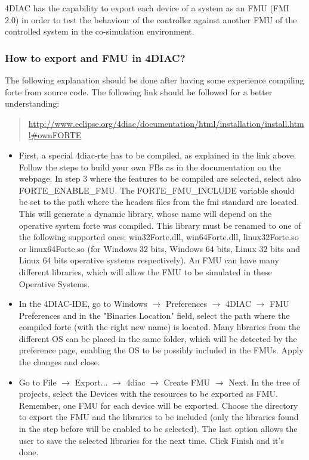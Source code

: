 4DIAC has the capability to export each device of a system as an FMU (FMI 2.0) in order to test the behaviour of the controller against another FMU of the controlled system in 
the co-simulation environment. 

\subsubsection{How to export and FMU in 4DIAC?}\label{sec:simulators:4diac:exportFMU}

The following explanation should be done after having some experience compiling forte from source code. The following link should be followed for a better understanding:

\begin{quote}
  \url{http://www.eclipse.org/4diac/documentation/html/installation/install.html#ownFORTE}
\end{quote}

\begin{itemize}
    \item First, a special 4diac-rte has to be compiled, as explained in the link above. Follow the steps to build your own FBs as in the documentation 
    on the webpage. In step 3 where the features to be compiled are selected, select also FORTE\_ENABLE\_FMU. The FORTE\_FMU\_INCLUDE variable should be set to the path where the headers files 
    from the fmi standard are located. This will generate a dynamic library, whose name will depend on the operative system forte was compiled. This library must be renamed to one of the following 
    supported ones: win32Forte.dll, win64Forte.dll, linux32Forte.so or linux64Forte.so (for Windows 32 bits, Windows 64 bits, Linux 32 bits and Linux 64 bits operative systems respectively). 
    An FMU can have many different libraries, which will allow the FMU to be simulated in these Operative Systems.
    \item In the 4DIAC-IDE, go to Windows $\rightarrow$ Preferences $\rightarrow$ 4DIAC $\rightarrow$ FMU Preferences and in the "Binaries Location" field, select the path where the compiled forte (with the right new name) 
    is located. Many libraries from the different OS can be placed in the same folder, which will be detected by the preference page, enabling the OS to be possibly included in the FMUs.
     Apply the changes and close.
    \item Go to File $\rightarrow$ Export... $\rightarrow$ 4diac $\rightarrow$ Create FMU $\rightarrow$ Next. In the tree of projects, select the Devices with the resources to be exported as FMU. Remember, one FMU for each device will be 
    exported. Choose the directory to export the FMU and the libraries to be included (only the libraries found in the step before will be enabled to be selected). The last option allows the user to 
    save the selected libraries for the next time. Click Finish and it's done.
\end{itemize}

